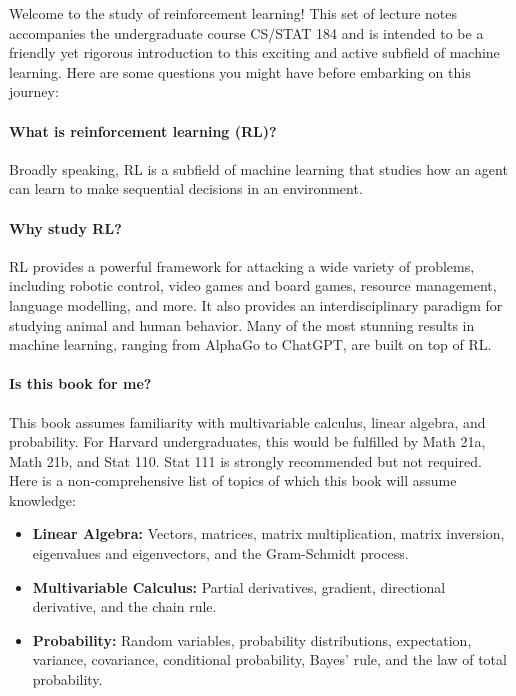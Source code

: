 \documentclass[\main/main]{subfiles}
\begin{document}
Welcome to the study of reinforcement learning! This set of lecture notes accompanies the undergraduate course CS/STAT 184 and is intended to be a friendly yet rigorous introduction to this exciting and active subfield of machine learning. Here are some questions you might have before embarking on this journey:

\paragraph{What is reinforcement learning (RL)?} Broadly speaking, RL is a subfield of machine learning that studies how an agent can learn to make sequential decisions in an environment.

\paragraph{Why study RL?} RL provides a powerful framework for attacking a wide variety of problems, including robotic control, video games and board games, resource management, language modelling, and more. It also provides an interdisciplinary paradigm for studying animal and human behavior. Many of the most stunning results in machine learning, ranging from AlphaGo to ChatGPT, are built on top of RL.

\paragraph{Is this book for me?} This book assumes familiarity with multivariable calculus, linear algebra, and probability. For Harvard undergraduates, this would be fulfilled by Math 21a, Math 21b, and Stat 110. Stat 111 is strongly recommended but not required. Here is a non-comprehensive list of topics of which this book will assume knowledge:

\begin{itemize}
    \item \textbf{Linear Algebra:} Vectors, matrices, matrix multiplication, matrix inversion, eigenvalues and eigenvectors, and the Gram-Schmidt process.
    \item \textbf{Multivariable Calculus:} Partial derivatives, gradient, directional derivative, and the chain rule.
    \item \textbf{Probability:} Random variables, probability distributions, expectation, variance, covariance, conditional probability, Bayes' rule, and the law of total probability.
\end{itemize}
\end{document}
